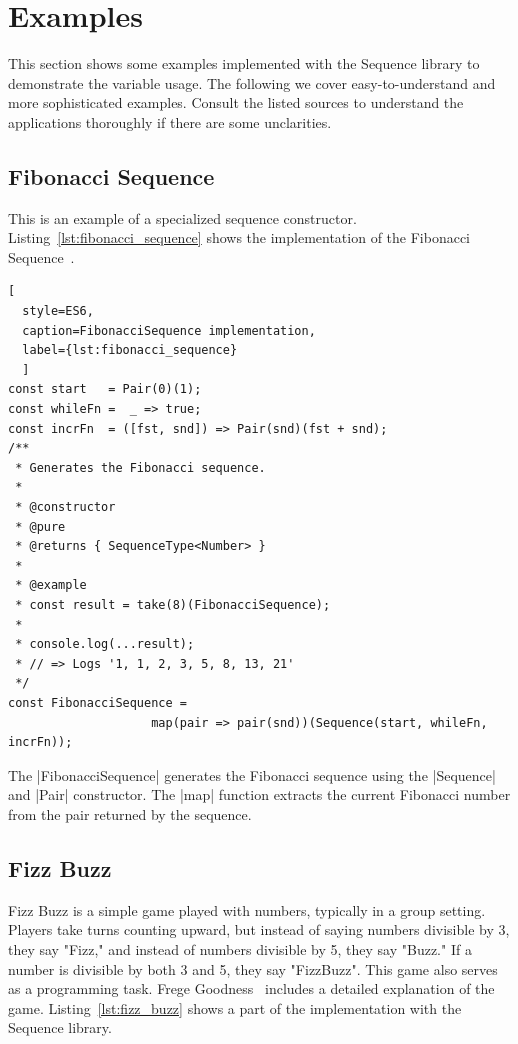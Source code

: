 \section{Examples} %
\label{sec:Examples}
This section shows some examples implemented with the
Sequence library to demonstrate the variable usage.
The following we cover easy-to-understand and more sophisticated
examples.  Consult the listed sources to understand the applications
thoroughly if there are some unclarities.

\subsection{Fibonacci Sequence}
\label{sub:Fibonacci Sequence}
This is an example of a specialized sequence constructor.
Listing~\ref{lst:fibonacci_sequence} shows the implementation of the Fibonacci 
Sequence~\cite[p.~36]{math_diskrete_2011}. 
\begin{lstlisting}[
  style=ES6, 
  caption=FibonacciSequence implementation,
  label={lst:fibonacci_sequence}
  ]
const start   = Pair(0)(1);
const whileFn =  _ => true;
const incrFn  = ([fst, snd]) => Pair(snd)(fst + snd);
/**
 * Generates the Fibonacci sequence.
 *
 * @constructor
 * @pure
 * @returns { SequenceType<Number> }
 *
 * @example
 * const result = take(8)(FibonacciSequence);
 *
 * console.log(...result);
 * // => Logs '1, 1, 2, 3, 5, 8, 13, 21'
 */
const FibonacciSequence = 
                    map(pair => pair(snd))(Sequence(start, whileFn, incrFn));
\end{lstlisting}
The |FibonacciSequence| generates the Fibonacci sequence using the
|Sequence| and |Pair| constructor. The |map| function extracts the current Fibonacci number
from the pair returned by the sequence.

\subsection{Fizz Buzz}
\label{sub:Fizz Buzz}
Fizz Buzz is a simple game played with numbers, typically in a group setting. Players
take turns counting upward, but instead of saying numbers divisible by 3, they
say "Fizz," and instead of numbers divisible by 5, they say "Buzz." If a number
is divisible by both 3 and 5, they say "FizzBuzz". This game also serves as a 
programming task.
\newline
Frege Goodness~\cite{frege_goodness} includes a detailed explanation of the
game. Listing~\ref{lst:fizz_buzz} shows a part of the implementation with the
Sequence library.

